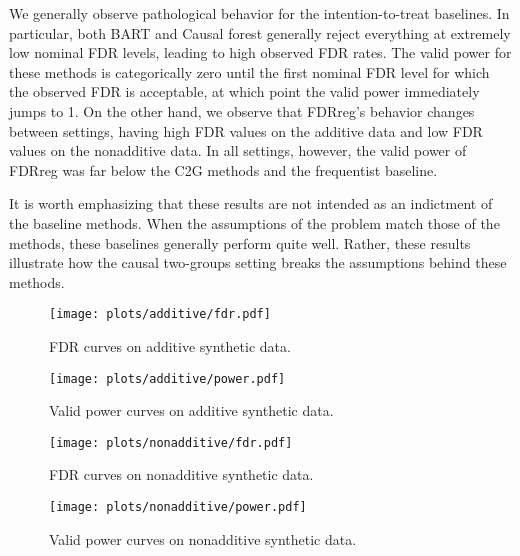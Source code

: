 We generally observe pathological behavior for the intention-to-treat baselines. In particular, both BART and Causal forest generally reject everything at extremely low nominal FDR levels, leading to high observed FDR rates. The valid power for these methods is categorically zero until the first nominal FDR level for which the observed FDR is acceptable, at which point the valid power immediately jumps to 1. On the other hand, we observe that FDRreg's behavior changes between settings, having high FDR values on the additive data and low FDR values on the nonadditive data. In all settings, however, the valid power of FDRreg was far below the C2G methods and the frequentist baseline.

It is worth emphasizing that these results are not intended as an indictment of the baseline methods. When the assumptions of the problem match those of the methods, these baselines generally perform quite well. Rather, these results illustrate how the causal two-groups setting breaks the assumptions behind these methods.

\begin{figure*}
\centering %
\hspace{-2em}\texttt{[image: plots/additive/fdr.pdf]}
\caption{FDR curves on additive synthetic data.}
\end{figure*}

\begin{figure*}
\centering %
\hspace{-2em}\texttt{[image: plots/additive/power.pdf]}
\caption{Valid power curves on additive synthetic data.}
\end{figure*}

%
%
%
%
%


\begin{figure*}
\centering 
\hspace{-2em}\texttt{[image: plots/nonadditive/fdr.pdf]}
\caption{FDR curves on nonadditive synthetic data.}
\end{figure*}

\begin{figure*}
\centering %
\hspace{-2em}\texttt{[image: plots/nonadditive/power.pdf]}
\caption{Valid power curves on nonadditive synthetic data.}
\end{figure*}

%
%
%
%
%